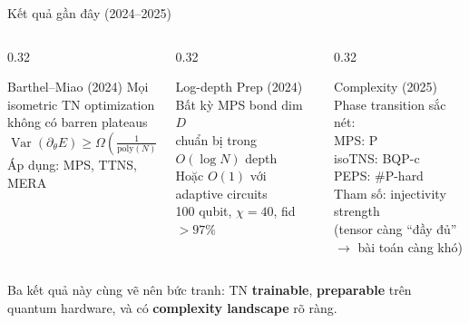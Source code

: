 \documentclass[aspectratio=169, 11pt]{beamer}
\newcommand{\highlight}[1]{\textcolor{qcyan}{\textbf{#1}}}
\newcommand{\warn}[1]{\textcolor{qamber}{#1}}
\newcommand{\good}[1]{\textcolor{qgreen}{#1}}
\newcommand{\pink}[1]{\textcolor{qpink}{#1}}
\begin{document}
\begin{frame}[shrink=8]{Kết quả gần đây (2024--2025)}

\begin{columns}[T]
\begin{column}{0.32\textwidth}
  \begin{block}{\centering Barthel--Miao (2024)}
    \centering
    Mọi isometric TN optimization\\
    \good{không có barren plateaus}\\[4pt]
    $\operatorname{Var}(\partial_\theta E) \geq \Omega\!\left(\frac{1}{\text{poly}(N)}\right)$\\[4pt]
    {\small Áp dụng: MPS, TTNS, MERA}
  \end{block}
\end{column}
\begin{column}{0.32\textwidth}
  \begin{block}{\centering Log-depth Prep (2024)}
    \centering
    Bất kỳ MPS bond dim $D$\\
    chuẩn bị trong \highlight{$O(\log N)$} depth\\[4pt]
    Hoặc $O(1)$ với adaptive circuits\\[4pt]
    {\small 100 qubit, $\chi=40$, fid $>97\%$}
  \end{block}
\end{column}
\begin{column}{0.32\textwidth}
  \begin{block}{\centering Complexity (2025)}
    \centering
    Phase transition sắc nét:\\[4pt]
    MPS: \good{P}\\
    isoTNS: \warn{BQP-c}\\
    PEPS: \pink{\#P-hard}\\[4pt]
    {\small Tham số: injectivity strength\\(tensor càng ``đầy đủ'' $\to$ bài toán càng khó)}
  \end{block}
\end{column}
\end{columns}

\vspace{8pt}
\centering
\textcolor{dimtext}{Ba kết quả này cùng vẽ nên bức tranh: TN \highlight{trainable}, \highlight{preparable} trên quantum hardware, và có \highlight{complexity landscape} rõ ràng.}

\end{frame}
\end{document}
